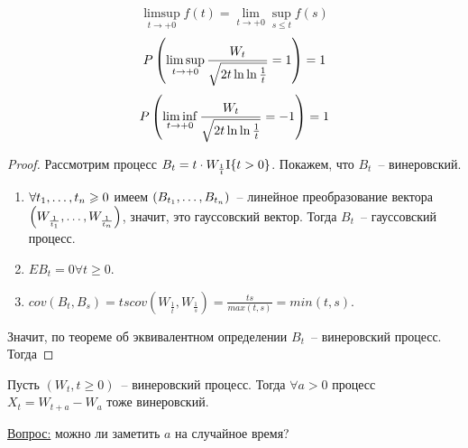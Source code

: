 \begin{corollary}
$$\limsup_{t \to +0} f(t) = \lim_{t \to +0} \sup_{s \leq t} f(s)$$
$$P \left( \limsup_{t \to +0} \frac{W_t}{\sqrt {2t \ln \ln \frac{1}{t}}} = 1 \right) = 1$$
$$P \left( \liminf_{t \to +0} \frac{W_t}{\sqrt {2t \ln \ln \frac{1}{t}}} = -1 \right) = 1$$
\end{corollary}
\begin{proof}
Рассмотрим процесс $B_t = t \cdot W_{\frac{1}{t}} \mathrm{I}\{ t>0 \}$. Покажем, что $B_t$~-- винеровский.

\begin{enumerate}
\item $\forall t_{1}, \dots, t_{n} \geqslant 0$ имеем $(B_{t_1}, \dots, B_{t_n})$~-- линейное преобразование вектора
$\left( W_{\frac{1}{t_1}}, \dots, W_{\frac{1}{t_n}} \right)$, значит, это гауссовский вектор. Тогда $B_t$~--
гауссовский процесс.

\item $EB_t = 0 \forall t \geq 0$.

\item $cov(B_t, B_s) = t s cov(W_\frac{1}{t}, W_\frac{1}{s}) = \frac{ts}{max(t,s)} = min(t, s)$.
\end{enumerate}

Значит, по теореме об эквивалентном определении $B_t$~-- винеровский процесс. Тогда
\end{proof}

\begin{theorem}
Пусть $(W_t, t \geq 0)$~-- винеровский процесс. Тогда $\forall a > 0$ процесс
$X_t = W_{t+a} - W_a$ тоже винеровский.

\underline{Вопрос:} можно ли заметить $a$ на случайное время?
\end{theorem}
